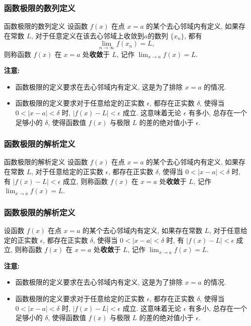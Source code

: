 \documentclass[
10pt, 
aspectratio=43, 
]{beamer}
\begin{document}
\begin{frame}
	\frametitle{函数极限的数列定义}
	\begin{block}{函数极限的数列定义}
		设函数 $f(x)$ 在点 $x=a$ 的某个去心邻域内有定义, 如果存在常数 $L$, 对于任意定义在该去心邻域上收敛到$a$的数列 $\{x_n\}$, 都有 
		\begin{equation*}
			\lim_{n\to\infty} f(x_n) = L, 
		\end{equation*}
		则称函数 $f(x)$ 在 $x=a$ 处\textbf{收敛}于 $L$, 记作 $\lim_{x \to a} f(x) = L$. 
	\end{block}
	
	\pause
	
	\textbf{注意: }
	\begin{itemize}
		\item 函数极限的定义要求在去心邻域内有定义, 这是为了排除 $x=a$ 的情况. 
		      \pause
		\item 函数极限的定义要求对于任意给定的正实数 $\epsilon$, 都存在正实数 $\delta$, 使得当 $0 < |x-a| < \delta$ 时, $|f(x) - L| < \epsilon$ 成立. 这意味着无论 $\epsilon$ 有多小, 总存在一个足够小的 $\delta$, 使得函数值 $f(x)$ 与极限 $L$ 的差的绝对值小于 $\epsilon$. 
	\end{itemize}
	
\end{frame}

\begin{frame}
	\frametitle{函数极限的解析定义}
	\begin{block}{函数极限的解析定义}
		设函数 $f(x)$ 在点 $x=a$ 的某个去心邻域内有定义, 如果存在常数 $L$, 对于任意给定的正实数 $\epsilon$, 都存在正实数 $\delta$, 使得当 $0 < |x-a| < \delta$ 时, 有 $|f(x) - L| < \epsilon$ 成立, 则称函数 $f(x)$ 在 $x=a$ 处\textbf{收敛}于 $L$, 记作 $\lim_{x \to a} f(x) = L$. 
	\end{block}
\end{frame}


\begin{frame}
	\frametitle{函数极限的解析定义}
	
	设函数 $f(x)$ 在点 $x=a$ 的某个去心邻域内有定义, 如果存在常数 $L$, 对于任意给定的正实数 $\epsilon$, 都存在正实数 $\delta$, 使得当 $0 < |x-a| < \delta$ 时, 有 $|f(x) - L| < \epsilon$ 成立, 则称函数 $f(x)$ 在 $x=a$ 处\textbf{收敛}于 $L$, 记作 $\lim_{x \to a} f(x) = L$. 
	
	\pause
	
	\textbf{注意: }
	\begin{itemize}
		\item 函数极限的定义要求在去心邻域内有定义, 这是为了排除 $x=a$ 的情况. 
		      \pause
		\item 函数极限的定义要求对于任意给定的正实数 $\epsilon$, 都存在正实数 $\delta$, 使得当 $0 < |x-a| < \delta$ 时, $|f(x) - L| < \epsilon$ 成立. 这意味着无论 $\epsilon$ 有多小, 总存在一个足够小的 $\delta$, 使得函数值 $f(x)$ 与极限 $L$ 的差的绝对值小于 $\epsilon$. 
	\end{itemize}
	
\end{frame}
\end{document}
